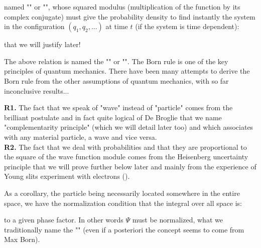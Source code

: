 	named "" or "", whose squared modulus (multiplication of the function by its complex conjugate) must give the probability density to find instantly the system in the configuration $(q_1,q_2,...)$ at time $t$ (if the system is time dependent):
	
	that we will justify later!
	
	The above relation is named the "" or "". The Born rule is one of the key principles of quantum mechanics. There have been many attempts to derive the Born rule from the other assumptions of quantum mechanics, with so far inconclusive results...
	
	\begin{tcolorbox}[title=Remark,colframe=black,arc=10pt]
	\textbf{R1.} The fact that we speak of "wave" instead of "particle" comes from the brilliant postulate and in fact quite logical of De Broglie that we name "complementarity principle" (which we will detail later too) and which associates with any material particle, a wave and vice versa.\\
	
	\textbf{R2.} The fact that we deal with probabilities and that they are proportional to the square of the wave function module comes from the Heisenberg uncertainty principle that we will prove further below later and mainly from the experience of Young slits experiment with electrons ().
	\end{tcolorbox}
	As a corollary, the particle being necessarily located somewhere in the entire space, we have the normalization condition that the integral over all space is:
	
	to a given phase factor. In other words $\Psi$ must be normalized, what we traditionally name the "" (even if a posteriori the concept seems to come from Max Born).
	
